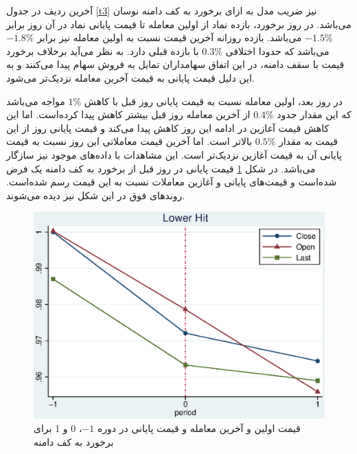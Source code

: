 \documentclass[12pt]{article}
\begin{document}
 آخرین ردیف در جدول 
 \ref{t3}
 نیز ضریب مدل به ازای برخورد به کف دامنه نوسان می‌باشد. 
 در روز برخورد، بازده نماد از اولین معامله تا قیمت پایانی نماد در آن روز برابر
  $ -1.5\% $
  می‌باشد.
  بازده روزانه آخرین قیمت نسبت به اولین معامله نیز برابر 
   $ -1.8\% $
   می‌باشد که حدودا اختلافی
   $ 0.3\% $
   با بازده قبلی دارد. به نظر می‌آید برخلاف برخورد قیمت با سقف دامنه، در این اتفاق سهامداران تمایل به فروش سهام پیدا می‌کنند و به این دلیل قیمت پایانی به قیمت آخرین معامله نزدیک‌تر می‌شود.
 
 در روز بعد، اولین معامله نسبت به قیمت پایانی روز قبل با کاهش 
 $ 1\% $
 مواجه می‌باشد که این مقدار حدود 
 $ 0.4\% $
 از آخرین معامله روز قبل بیشتر کاهش پیدا کرده‌است. 
 اما این کاهش قیمت آغازین در ادامه این روز کاهش پیدا می‌کند و قیمت پایانی روز از این قیمت به مقدار 
 $0.5\% $
 بالا‌تر است. اما آخرین قیمت معاملاتی این روز نسبت به قیمت پایانی آن به قیمت آغازین نزدیک‌تر است.
 این مشاهدات با داده‌های موجود نیز سازگار می‌باشد. در شکل 
 \ref{g11}
 قیمت پایانی در روز قبل از برخورد به کف دامنه یک فرض شده‌است و قیمت‌های پایانی و آغازین معاملات نسبت به این قیمت رسم شده‌است.
 روند‌های فوق در این شکل نیز دیده می‌شوند.
 
 
  \begin{figure}[htbp]
  \centering
  \includegraphics[width=0.8\columnwidth]{DLT.eps}
 \caption{ قیمت اولین  و آخرین معامله و قیمت پایانی در دوره 
 $ -1 $،
 0 
 و 
 1 
 برای برخورد به کف دامنه}
  \label{g11}
  \end{figure}
  
\end{document}
